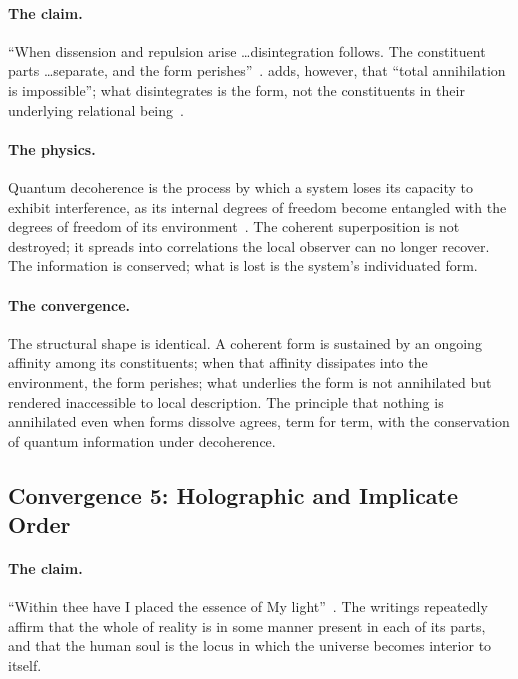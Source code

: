 \paragraph{The \bahai claim.}
``When dissension and repulsion arise \ldots disintegration follows.
The constituent parts \ldots separate, and the form perishes''~\citep[Talk 41]{PUP}.
\AbdulBaha adds, however, that ``total annihilation is impossible'';
what disintegrates is the form, not the constituents in their underlying
relational being~\citep[Talk 38]{PUP}.

\paragraph{The physics.}
Quantum decoherence is the process by which a system loses its capacity to
exhibit interference, as its internal degrees of freedom become entangled with
the degrees of freedom of its environment~\citep{Zurek2003}.
The coherent superposition is not destroyed; it spreads into correlations the
local observer can no longer recover.
The information is conserved; what is lost is the system's individuated form.

\paragraph{The convergence.}
The structural shape is identical.
A coherent form is sustained by an ongoing affinity among its constituents;
when that affinity dissipates into the environment, the form perishes; what
underlies the form is not annihilated but rendered inaccessible to local
description.
The \bahai principle that nothing is annihilated even when forms dissolve
agrees, term for term, with the conservation of quantum information under
decoherence.

\subsection{Convergence 5: Holographic and Implicate Order}

\paragraph{The \bahai claim.}
``Within thee have I placed the essence of My light''~\citep[Arabic 12]{HiddenWords}.
The \bahai writings repeatedly affirm that the whole of reality is in some
manner present in each of its parts, and that the human soul is the locus in
which the universe becomes interior to itself.

